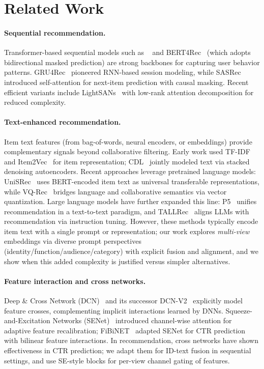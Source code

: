 \section{Related Work}
\paragraph{Sequential recommendation.}
Transformer-based sequential models such as
\base~\cite{kang2018sasrec} and BERT4Rec~\cite{sun2019bert4rec}
(which adopts bidirectional masked prediction) are strong backbones for
capturing user behavior patterns.
GRU4Rec~\cite{hidasi2015gru4rec} pioneered RNN-based session
modeling, while SASRec introduced self-attention for next-item
prediction with causal masking. Recent efficient variants
include LightSANs~\cite{fan2021lightsans} with low-rank
attention decomposition for reduced complexity.

\paragraph{Text-enhanced recommendation.}
Item text features (from bag-of-words, neural encoders, or
\llm embeddings) provide complementary signals beyond
collaborative filtering. Early work used TF-IDF and
Item2Vec~\cite{barkan2016item2vec} for item representation;
CDL~\cite{wang2015cdl} jointly modeled text via stacked
denoising autoencoders. Recent approaches leverage pretrained
language models: UniSRec~\cite{hou2022unisrec} uses
BERT-encoded item text as universal transferable
representations, while VQ-Rec~\cite{hou2023vqrec} bridges
language and collaborative semantics via vector quantization.
Large language models have further expanded this line:
P5~\cite{geng2022p5} unifies recommendation in a text-to-text
paradigm, and TALLRec~\cite{bao2023tallrec} aligns LLMs with
recommendation via instruction tuning. However, these methods
typically encode item text with a single prompt or
representation; our work explores \emph{multi-view} \llm
embeddings via diverse prompt perspectives
(identity/function/audience/category) with explicit fusion and
alignment, and we show when this added complexity is justified
versus simpler alternatives.

\paragraph{Feature interaction and cross networks.}
Deep \& Cross Network (DCN)~\cite{wang2017dcn} and its
successor DCN-V2~\cite{wang2021dcnv2} explicitly model feature
crosses, complementing implicit interactions learned by DNNs.
Squeeze-and-Excitation Networks (SENet)~\cite{hu2018senet}
introduced channel-wise attention for adaptive feature
recalibration; FiBiNET~\cite{huang2019fibinet} adapted SENet
for CTR prediction with bilinear feature interactions. In
recommendation, cross networks have shown effectiveness in CTR
prediction; we adapt them for ID-text fusion in sequential
settings, and use SE-style blocks for per-view channel gating of \llm
features.

